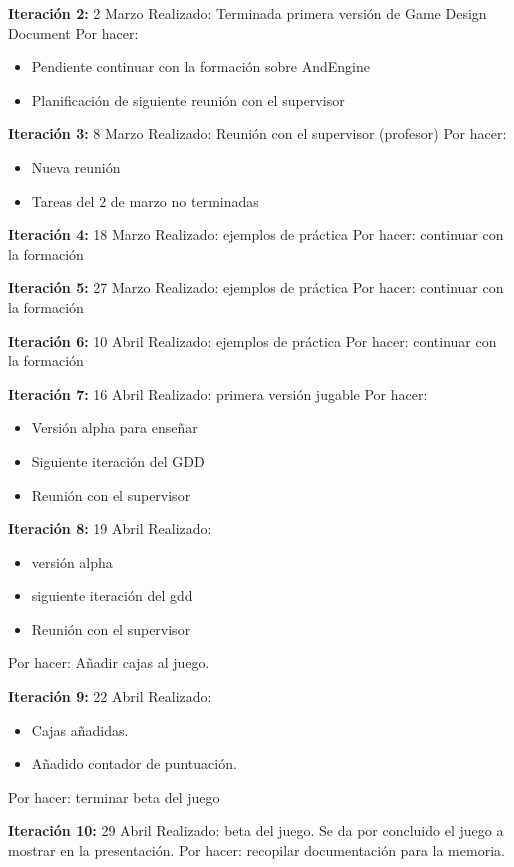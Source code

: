 \documentclass[12 pt, a4paper, twoside]{article}
\begin{document}
\textbf{Iteración 2:}
2 Marzo
Realizado: Terminada primera versión de Game Design Document
Por hacer:
\begin{itemize}
\item Pendiente continuar con la formación sobre AndEngine
\item Planificación de siguiente reunión con el supervisor
\end{itemize}

\textbf{Iteración 3:}
8 Marzo
Realizado: Reunión con el supervisor (profesor)
Por hacer:
\begin{itemize}
\item Nueva reunión
\item Tareas del 2 de marzo no terminadas
\end{itemize}

\textbf{Iteración 4:}
18 Marzo
Realizado: ejemplos de práctica
Por hacer: continuar con la formación

\textbf{Iteración 5:}
27 Marzo
Realizado: ejemplos de práctica
Por hacer: continuar con la formación

\textbf{Iteración 6:}
10 Abril
Realizado: ejemplos de práctica
Por hacer: continuar con la formación

\textbf{Iteración 7:}
16 Abril
Realizado: primera versión jugable
Por hacer:
\begin{itemize}
\item Versión alpha para enseñar
\item Siguiente iteración del GDD
\item Reunión con el supervisor
\end{itemize}

\textbf{Iteración 8:}
19 Abril
Realizado:
\begin{itemize}
\item versión alpha
\item siguiente iteración del gdd
\item Reunión con el supervisor
\end{itemize}
Por hacer: Añadir cajas al juego.

\textbf{Iteración 9:}
22 Abril
Realizado:
\begin{itemize}
\item Cajas añadidas.
\item Añadido contador de puntuación.
\end{itemize}
Por hacer: terminar beta del juego

\textbf{Iteración 10:}
29 Abril
Realizado: beta del juego. Se da por concluido el juego a mostrar en
la presentación.
Por hacer: recopilar documentación para la memoria.
\end{document}
